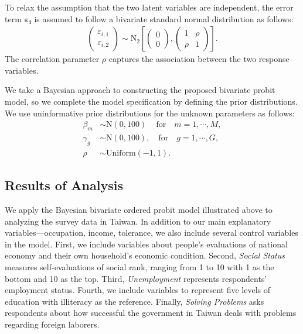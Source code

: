 \documentclass[12pt]{article}
\newcommand{\bpm}{\begin{pmatrix}}
\newcommand{\epm}{\end{pmatrix}}
\begin{document}
To relax the assumption that the two latent variables are independent, the error term $\bm{\varepsilon_{i}}$ is assumed to follow a bivariate standard normal distribution as follows:
\begin{align}
  \bpm \varepsilon_{i,1} \\ \varepsilon_{i,2}  \epm \sim \text{N}_{2} \left[ \bpm 0 \\ 0  \epm, \bpm 1 & \rho \\ \rho & 1 \epm \right].
\end{align} 
The correlation parameter $\rho$ captures the association between the two response variables.


We take a Bayesian approach to constructing the proposed bivariate probit model, so we complete the model specification by defining the prior distributions. We use uninformative prior distributions for the unknown parameters as follows:
\begin{align}
  \beta_{m} &\sim \text{N}(0, 100)\, \quad \text{for} \quad m=1,\cdots ,M, \\
  \gamma_{g} &\sim \text{N}(0, 100), \quad \text{for} \quad g=1,\cdots ,G, \\
  \rho &\sim \text{Uniform}(-1,1).
\end{align} 



\subsection{Results of Analysis}


We apply the Bayesian bivariate ordered probit model illustrated above to analyzing the survey data in Taiwan. In addition to our main explanatory variables---occupation, income, tolerance, we also include several control variables in the model. First, we include variables about people's evaluations of national economy and their own household's economic condition. Second, \textit{Social Status} measures self-evaluations of social rank, ranging from 1 to 10 with 1 as the bottom and 10 as the top. Third, \textit{Unemployment} represents respondents' employment status. Fourth, we include variables to represent five levels of education with illiteracy as the reference. Finally, \textit{Solving Problems} asks respondents about how successful the government in Taiwan deals with problems regarding foreign laborers. 
\end{document}
